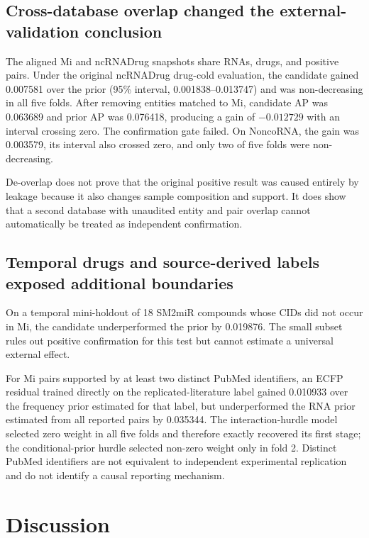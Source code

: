 \documentclass[10pt]{article}
\begin{document}
\subsection{Cross-database overlap changed the external-validation conclusion}

The aligned Mi and ncRNADrug snapshots share RNAs, drugs, and positive pairs. Under the original ncRNADrug drug-cold evaluation, the candidate gained 0.007581 over the prior (95\% interval, 0.001838--0.013747) and was non-decreasing in all five folds. After removing entities matched to Mi, candidate AP was 0.063689 and prior AP was 0.076418, producing a gain of $-0.012729$ with an interval crossing zero. The confirmation gate failed. On NoncoRNA, the gain was 0.003579, its interval also crossed zero, and only two of five folds were non-decreasing.

De-overlap does not prove that the original positive result was caused entirely by leakage because it also changes sample composition and support. It does show that a second database with unaudited entity and pair overlap cannot automatically be treated as independent confirmation.

\subsection{Temporal drugs and source-derived labels exposed additional boundaries}

On a temporal mini-holdout of 18 SM2miR compounds whose CIDs did not occur in Mi, the candidate underperformed the prior by 0.019876. The small subset rules out positive confirmation for this test but cannot estimate a universal external effect.

For Mi pairs supported by at least two distinct PubMed identifiers, an ECFP residual trained directly on the replicated-literature label gained 0.010933 over the frequency prior estimated for that label, but underperformed the RNA prior estimated from all reported pairs by 0.035344. The interaction-hurdle model selected zero weight in all five folds and therefore exactly recovered its first stage; the conditional-prior hurdle selected non-zero weight only in fold 2. Distinct PubMed identifiers are not equivalent to independent experimental replication and do not identify a causal reporting mechanism.

\section{Discussion}
\end{document}
